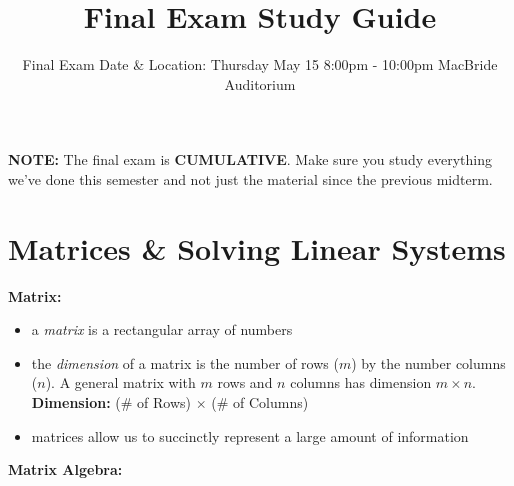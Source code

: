 \documentclass[12pt]{article}
\begin{document}
\title{Final Exam Study Guide}
\date{Final Exam Date \& Location: Thursday May 15 8:00pm - 10:00pm MacBride Auditorium}
\author{}
\maketitle

{\Large \textbf{NOTE:} The final exam is \textbf{CUMULATIVE}. Make sure you study everything we've done this semester and not just the material since the previous midterm.}

\section{Matrices \& Solving Linear Systems}

\textbf{Matrix:}

\begin{itemize}
\item a \textit{matrix} is a rectangular array of numbers
\item the \textit{dimension} of a matrix is the number of rows ($m$) by the number columns ($n$). A general matrix with $m$ rows and $n$ columns has dimension $m \times n$. \textbf{Dimension:} (\# of Rows) $\times$ (\# of Columns)
\item matrices allow us to succinctly represent a large amount of information
\end{itemize}

\vspace{1cm}

\textbf{Matrix Algebra:} 
\end{document}
